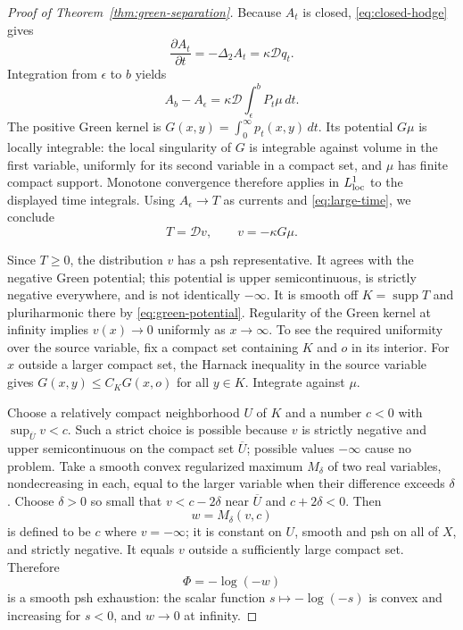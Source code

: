 \documentclass[11pt]{article}
\theoremstyle{remark}
\newcommand{\D}{\mathcal D}
\newcommand{\supp}{\operatorname{supp}}
\begin{document}
\begin{proof}[Proof of Theorem~\ref{thm:green-separation}]
Because $A_t$ is closed, \eqref{eq:closed-hodge} gives
\[
 \frac{\partial A_t}{\partial t}
 =-\Delta_2A_t=\kappa\D q_t.
\]
Integration from $\epsilon$ to $b$ yields
\[
 A_b-A_\epsilon
      =\kappa\D\int_\epsilon^b P_t\mu\,dt.
\]
The positive Green kernel is $G(x,y)=\int_0^\infty p_t(x,y)\,dt$.
Its potential $G\mu$ is locally integrable: the local singularity
of $G$ is integrable against volume in the first variable, uniformly
for its second variable in a compact set, and $\mu$ has finite
compact support. Monotone convergence therefore applies in
$L^1_{\rm loc}$ to the displayed time integrals. Using
$A_\epsilon\to T$ as currents and \eqref{eq:large-time}, we conclude
\begin{equation}\label{eq:green-potential}
 T=\D v,\qquad v=-\kappa G\mu.
\end{equation}

Since $T\geq0$, the distribution $v$ has a psh representative.
It agrees with the negative Green potential; this potential is
upper semicontinuous, is strictly negative everywhere, and is not
identically $-\infty$. It is smooth off $K=\supp T$ and
pluriharmonic there by \eqref{eq:green-potential}.
Regularity of the Green kernel at infinity implies $v(x)\to0$
uniformly as $x\to\infty$. To see the required uniformity over
the source variable, fix a compact set containing $K$ and $o$ in
its interior. For $x$ outside a larger compact set, the Harnack
inequality in the source variable gives
$G(x,y)\leq C_KG(x,o)$ for all $y\in K$. Integrate against $\mu$.

Choose a relatively compact neighborhood $U$ of $K$ and a number
$c<0$ with $\sup_{\overline U}v<c$. Such a strict choice is
possible because $v$ is strictly negative and upper semicontinuous
on the compact set $\overline U$; possible values $-\infty$ cause
no problem. Take a smooth convex regularized maximum $M_\delta$
of two real variables, nondecreasing in each, equal to the larger
variable when their difference exceeds $\delta$.
Choose $\delta>0$ so small that
$v<c-2\delta$ near $\overline U$ and $c+2\delta<0$.
Then
\[
 w=M_\delta(v,c)
\]
is defined to be $c$ where $v=-\infty$; it is constant on $U$,
smooth and psh on all of $X$, and strictly negative. It equals
$v$ outside a sufficiently large compact set. Therefore
\[
 \Phi=-\log(-w)
\]
is a smooth psh exhaustion: the scalar function $s\mapsto-\log(-s)$
is convex and increasing for $s<0$, and $w\to0$ at infinity.
\end{proof}
\end{document}
